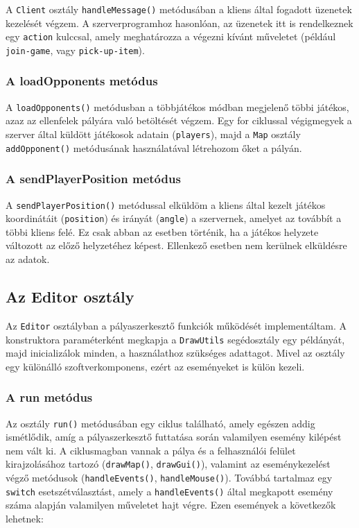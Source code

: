 A \verb|Client| osztály \verb|handleMessage()| metódusában a kliens által fogadott üzenetek kezelését végzem. A szerverprogramhoz hasonlóan, az üzenetek itt is rendelkeznek egy \verb|action| kulccsal, amely meghatározza a végezni kívánt műveletet (például \verb|join-game|, vagy \verb|pick-up-item|).

\subsubsection{A loadOpponents metódus}

A \verb|loadOpponents()| metódusban a többjátékos módban megjelenő többi játékos, azaz az ellenfelek pályára való betöltését végzem. Egy for ciklussal végigmegyek a szerver által küldött játékosok adatain (\verb|players|), majd a \verb|Map| osztály \verb|addOpponent()| metódusának használatával létrehozom őket a pályán.

\subsubsection{A sendPlayerPosition metódus}

A \verb|sendPlayerPosition()| metódussal elküldöm a kliens által kezelt játékos koordinátáit (\verb|position|) és irányát (\verb|angle|) a szervernek, amelyet az továbbít a többi kliens felé. Ez csak abban az esetben történik, ha a játékos helyzete változott az előző helyzetéhez képest. Ellenkező esetben nem kerülnek elküldésre az adatok.

\newpage

\subsection{Az Editor osztály}

Az \verb|Editor| osztályban a pályaszerkesztő funkciók működését implementáltam. A konstruktora paraméterként megkapja a \verb|DrawUtils| segédosztály egy példányát, majd inicializálok minden, a használathoz szükséges adattagot. Mivel az osztály egy különálló szoftverkomponens, ezért az eseményeket is külön kezeli.

\subsubsection{A run metódus}

Az osztály \verb|run()| metódusában egy ciklus található, amely egészen addig ismétlődik, amíg a pályaszerkesztő futtatása során valamilyen esemény kilépést nem vált ki. A ciklusmagban vannak a pálya és a felhasználói felület kirajzolásához tartozó (\verb|drawMap()|, \verb|drawGui()|), valamint az eseménykezelést végző metódusok (\verb|handleEvents()|, \verb|handleMouse()|). Továbbá tartalmaz egy \verb|switch| esetszétválasztást, amely a \verb|handleEvents()| által megkapott esemény száma alapján valamilyen műveletet hajt végre. Ezen események a következők lehetnek:

